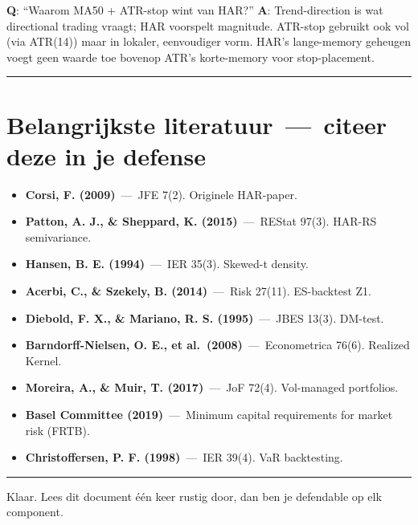 \documentclass[11pt,a4paper]{article}
\begin{document}
\textbf{Q}: ``Waarom MA50 + ATR-stop wint van HAR?''
\textbf{A}: Trend-direction is wat directional trading vraagt; HAR voorspelt magnitude. ATR-stop gebruikt ook vol (via ATR(14)) maar in lokaler, eenvoudiger vorm. HAR's lange-memory geheugen voegt geen waarde toe bovenop ATR's korte-memory voor stop-placement.

\begin{center}\rule{0.5\linewidth}{0.5pt}\end{center}

\hypertarget{belangrijkste-literatuur-citeer-deze-in-je-defense}{%
\section{Belangrijkste literatuur \,---\, citeer deze in je defense}\label{belangrijkste-literatuur-citeer-deze-in-je-defense}}

\begin{itemize}
\tightlist
\item
  \textbf{Corsi, F. (2009)} \,---\, JFE 7(2). Originele HAR-paper.
\item
  \textbf{Patton, A. J., \& Sheppard, K. (2015)} \,---\, REStat 97(3). HAR-RS semivariance.
\item
  \textbf{Hansen, B. E. (1994)} \,---\, IER 35(3). Skewed-t density.
\item
  \textbf{Acerbi, C., \& Szekely, B. (2014)} \,---\, Risk 27(11). ES-backtest Z1.
\item
  \textbf{Diebold, F. X., \& Mariano, R. S. (1995)} \,---\, JBES 13(3). DM-test.
\item
  \textbf{Barndorff-Nielsen, O. E., et al.~(2008)} \,---\, Econometrica 76(6). Realized Kernel.
\item
  \textbf{Moreira, A., \& Muir, T. (2017)} \,---\, JoF 72(4). Vol-managed portfolios.
\item
  \textbf{Basel Committee (2019)} \,---\, Minimum capital requirements for market risk (FRTB).
\item
  \textbf{Christoffersen, P. F. (1998)} \,---\, IER 39(4). VaR backtesting.
\end{itemize}

\begin{center}\rule{0.5\linewidth}{0.5pt}\end{center}

Klaar. Lees dit document één keer rustig door, dan ben je defendable op elk component.
\end{document}
